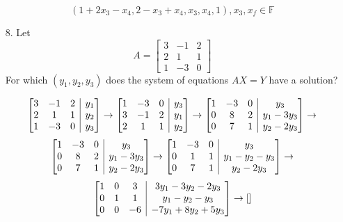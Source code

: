 \documentclass{article}
\makeatletter
\newenvironment{abmatrix}[2]
{
    \left[
        \begin{array} {@{} *{#1}{c} | *{#2}c @{}}
}
{
        \end{array}
    \right]
}
\makeatother
\begin{document}
\begin{enumerate}[listparindent=\parindent]
\[
    \boxed{
        (1 + 2x_3 - x_4, 2 - x_3 + x_4, x_3, x_4, 1), x_3, x_f \in \mathbb F
    }
\]

\item[8.] Let
    \[
        A = \begin{bmatrix}
            3 & -1 & 2 \\
            2 & 1 & 1 \\
            1 & -3 & 0
        \end{bmatrix}
    \]
    For which \( (y_1, y_2, y_3) \) does the system of equations \(AX = Y\) have a solution?

\[
    \begin{abmatrix}{3}{1}
        3 & -1 & 2 & y_1 \\
        2 & 1 & 1 & y_2 \\
        1 & -3 & 0 & y_3
    \end{abmatrix}
    \rightarrow
    \begin{abmatrix}{3}{1}
        1 & -3 & 0 & y_3 \\
        3 & -1 & 2 & y_1 \\
        2 & 1 & 1 & y_2
    \end{abmatrix}
    \rightarrow
    \begin{abmatrix}{3}{1}
        1 & -3 & 0 & y_3 \\
        0 & 8 & 2 & y_1 - 3y_3 \\
        0 & 7 & 1 & y_2 - 2y_3
    \end{abmatrix}
    \rightarrow
\]
\[
    \begin{abmatrix}{3}{1}
        1 & -3 & 0 & y_3 \\
        0 & 8 & 2 & y_1 - 3y_3 \\
        0 & 7 & 1 & y_2 - 2y_3
    \end{abmatrix}
    \rightarrow
    \begin{abmatrix}{3}{1}
        1 & -3 & 0 & y_3 \\
        0 & 1 & 1 & y_1 - y_2 - y_3 \\
        0 & 7 & 1 & y_2 - 2y_3
    \end{abmatrix}
    \rightarrow
\]
\[
    \begin{abmatrix}{3}{1}
        1 & 0 & 3 & 3y_1 - 3y_2 - 2y_3 \\
        0 & 1 & 1 & y_1 - y_2 - y_3 \\
        0 & 0 & -6 & -7y_1 + 8y_2 + 5y_3
    \end{abmatrix}
    \rightarrow
    \begin{abmatrix}{3}{1}

\end{abmatrix}\]
\end{enumerate}
\end{document}
